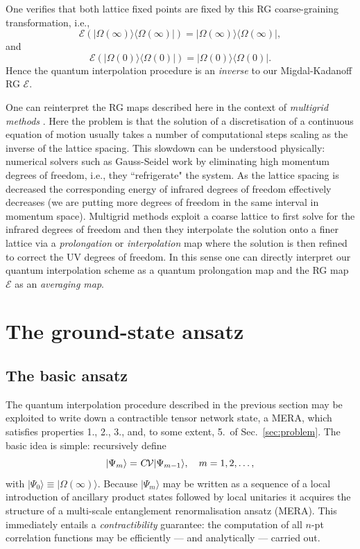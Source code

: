 \documentclass[twocolumn,lengthcheck,superscriptaddress]{revtex4-1}
\theoremstyle{definition}
\theoremstyle{remark}
\begin{document}
One verifies that both lattice fixed points are fixed by this RG coarse-graining transformation, i.e.,
\begin{equation}
	\mathcal{E}(|\Omega(\infty)\rangle\langle\Omega(\infty)|) = |\Omega(\infty)\rangle\langle\Omega(\infty)|,
\end{equation}
and
\begin{equation}
	\mathcal{E}(|\Omega(0)\rangle\langle\Omega(0)|) = |\Omega(0)\rangle\langle\Omega(0)|.
\end{equation}
Hence the quantum interpolation procedure is an \emph{inverse} to our Migdal-Kadanoff RG $\mathcal{E}$.

One can reinterpret the RG maps described here in the context of \emph{multigrid methods} \cite{wesseling:2004a}. Here the problem is that the solution of a discretisation of a continuous equation of motion usually takes a number of computational steps scaling as the inverse of the lattice spacing. This slowdown can be understood physically: numerical solvers such as Gauss-Seidel work by eliminating high momentum degrees of freedom, i.e., they ``refrigerate" the system. As the lattice spacing is decreased the corresponding energy of infrared degrees of freedom effectively decreases (we are putting more degrees of freedom in the same interval in momentum space). Multigrid methods exploit a coarse lattice to first solve for the infrared degrees of freedom and then they interpolate the solution onto a finer lattice via a \emph{prolongation} or \emph{interpolation} map where the solution is then refined to correct the UV degrees of freedom. In this sense one can directly interpret our quantum interpolation scheme as a quantum prolongation map and the RG map $\mathcal{E}$ as an \emph{averaging map}.
 

\section{The ground-state ansatz}
\label{sec:gs-ansatz}

\subsection{The basic ansatz}
The quantum interpolation procedure described in the previous section may be exploited to write down a contractible tensor network state, a MERA, which satisfies properties 1., 2., 3., and, to some extent, 5.\ of Sec.~\ref{sec:problem}. The basic idea is simple: recursively define
\begin{equation}\label{eq:basicansatz}
	|\Psi_m\rangle = \textsl{C}\mathcal{V}|\Psi_{m-1}\rangle, \quad m = 1, 2, \ldots,
\end{equation}
with $|\Psi_0\rangle \equiv |\Omega(\infty)\rangle$. Because $|\Psi_m\rangle$ may be written as a sequence of a local introduction of ancillary product states followed by local unitaries it acquires the structure of a multi-scale entanglement renormalisation ansatz (MERA). This immediately entails a \emph{contractibility} guarantee: the computation of all $n$-pt correlation functions may be efficiently --- and analytically --- carried out. 
\end{document}
